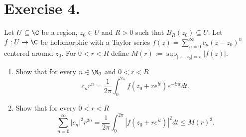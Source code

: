 \section*{Exercise 4.}

Let $U\subseteq \C$ be a region, $z_0\in U$ and $R > 0$ such that $B_R(z_0) \subseteq U$. Let $f: U \to \C$ be holomorphic with a Taylor series $f(z) = \sum_{n = 0}^{\infty} c_n(z-z_0)^n$ centered around $z_0$. For $0< r < R$ define $M(r) := \sup_{|z-z_0| = r}|f(z)|$.
\begin{enumerate}[label=(\alph*)]
    \item Show that for every $n \in \N_0$ and $0< r < R$
    \[ c_n r^n = \frac{1}{2\pi} \int_0^{2\pi} f(z_0 + re^{it})e^{-int} dt. \]
    \item Show that for every $0< r < R$
    \[ \sum_{n=0}^{\infty} |c_n|^{2}r^{2n} = \frac{1}{2\pi} \int_{0}^{2\pi} |f(z_0+re^{it})|^2 dt \leq M(r)^2. \]
\end{enumerate} 
